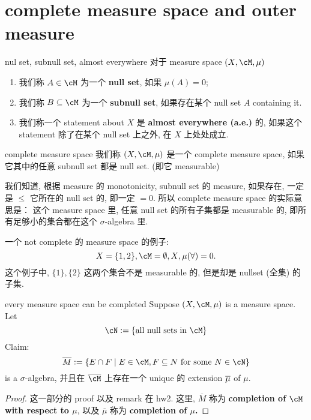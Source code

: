 \documentclass[lang=cn,11pt]{elegantbook}
\begin{document}
\chapter{complete measure space and outer measure}

\begin{definition}{nul set, subnull set, almost everywhere}
对于 measure space $(X, \cM, \mu)$
\begin{enumerate}
    \item 我们称 $A \in \cM$ 为一个 \textbf{null set}, 如果 $\mu(A) = 0$;
    \item 我们称 $B \sub \cM$ 为一个 \textbf{subnull set}, 如果存在某个 null set $A$ containing it.
    \item 我们称一个 statement about $X$ 是 \textbf{almost everywhere (a.e.)} 的, 如果这个 statement 除了在某个 null set 上之外, 在 $X$ 上处处成立.
\end{enumerate}
\end{definition}


\begin{definition}{complete measure space}
    我们称 $(X,\cM, \mu)$ 是一个 complete measure space, 如果它其中的任意 subnull set 都是 null set. (即它 measurable)
\end{definition}
\begin{remark}
    我们知道, 根据 measure 的 monotonicity, subnull set 的 measure, 如果存在, 一定是 $\leq$ 它所在的 null set 的, 即一定 $=0$. 所以 complete measure space 的实际意思是： 这个 measure space 里, 任意 null set 的所有子集都是 measurable 的, 即所有足够小的集合都在这个 $\sigma$-algebra 里.
\end{remark}




\begin{example} 一个 not complete 的 measure space 的例子:
$$
X = \{1,2\}, \cM = {\emptyset, X}, \mu(\forall) = 0.
$$
这个例子中, $\{1\}, \{2\}$ 这两个集合不是 measurable 的, 但是却是 nullset (全集) 的子集.
\end{example}



\begin{theorem}{every measure space can be completed}
    Suppose $(X, \cM,\mu)$ is a measure space.\\
    Let 
    \[
    \cN := \{\text{all null sets in }   \cM \}
    \]
    Claim:
    \[
    \ol{M}  := \{   E\cap F \mid E \in \cM, F \sub N \text{ for some } N \in \cN \}
    \]
    is a $\sigma$-algebra, 并且在 $\ol{\cM}$ 上存在一个 unique 的 extension $\overline{\mu}$ of $\mu$.
\end{theorem}
\begin{proof}
    这一部分的 proof 以及 remark 在 hw2. 这里, $\overline{M}$ 称为 \textbf{completion of $\cM$ with respect to $\mu$}, 以及 $\overline{\mu}$ 称为 \textbf{completion of $\mu$.}
\end{proof}
\end{document}
